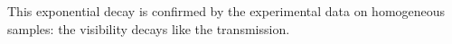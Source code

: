This exponential decay is confirmed by the experimental data on homogeneous samples: the visibility decays like the transmission.